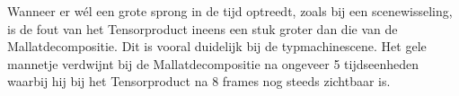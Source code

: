 Wanneer er w\'el een grote sprong in de tijd optreedt, zoals bij een scenewisseling, is de fout van het Tensorproduct ineens een stuk groter dan die van de Mallatdecompositie. Dit is vooral duidelijk bij de typmachinescene. Het gele mannetje verdwijnt bij de Mallatdecompositie na ongeveer 5 tijdseenheden waarbij hij bij het Tensorproduct na 8 frames nog steeds zichtbaar is.



